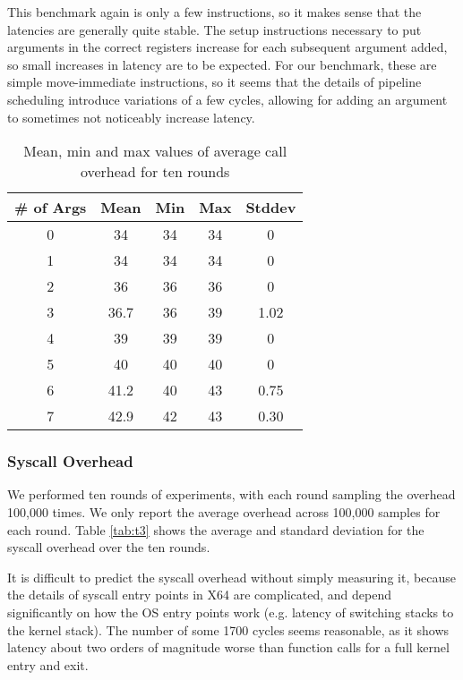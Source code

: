 This benchmark again is only a few instructions, so it makes sense
that the latencies are generally quite stable.
%
The setup instructions necessary to put arguments in the correct
registers increase for each subsequent argument added, so small
increases in latency are to be expected.
%
For our benchmark, these are simple move-immediate instructions, so it
seems that the details of pipeline scheduling introduce variations of
a few cycles, allowing for adding an argument to sometimes not
noticeably increase latency.

\begin{table}[htb]

\caption{Mean, min and max values of average call overhead for ten rounds}

    \begin{tabular}{|c|c|c|c|c|} 
     \hline
     \# of Args & Mean & Min & Max & Stddev \\ 
     \hline
     0 & 34 & 34 & 34 & 0 \\ 
     \hline
     1 & 34 & 34 & 34 & 0\\ 
     \hline
     2 & 36 & 36 & 36 & 0\\ 
     \hline
     3 & 36.7 & 36 & 39 & 1.02\\ 
     \hline
     4 & 39 & 39 & 39 & 0\\ 
     \hline
     5 & 40 & 40 & 40 & 0\\ 
     \hline
     6 & 41.2 & 40 & 43 & 0.75 \\ 
     \hline
     7 & 42.9 & 42 & 43 & 0.30\\ 
     \hline
    \end{tabular}
    \label{tab:t2}
\end{table}


\subsubsection{Syscall Overhead}
We performed ten rounds of experiments, with each round sampling the
overhead 100,000 times.
%
We only report the average overhead across 100,000 samples for each
round.
%
Table \ref{tab:t3} shows the average and standard deviation for the
syscall overhead over the ten rounds.

It is difficult to predict the syscall overhead without simply
measuring it, because the details of syscall entry points in X64 are
complicated, and depend significantly on how the OS entry points work
(e.g. latency of switching stacks to the kernel stack).
%
The number of some 1700 cycles seems reasonable, as it shows latency
about two orders of magnitude worse than function calls for a full
kernel entry and exit.

